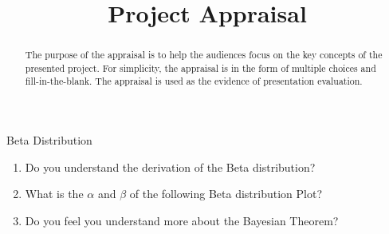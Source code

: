 \documentclass{article}
\title{Project Appraisal}
\author{}
\date{}
\begin{document}
\maketitle

\begin{abstract}
    The purpose of the appraisal is to help the audiences focus on the key concepts of the presented project. For simplicity, the appraisal is in the form of multiple choices and fill-in-the-blank. The appraisal is used as the evidence of presentation evaluation.
\end{abstract}

\begin{problem}
    {Beta Distribution}{}
    \begin{enumerate}
        \item Do you understand the derivation of the Beta distribution? \myrule{}
        \item What is the $\alpha$ and $\beta$ of the following Beta distribution Plot? 
        \item Do you feel you understand more about the Bayesian Theorem? \myrule{}
    \end{enumerate}
\end{problem}
\end{document}
